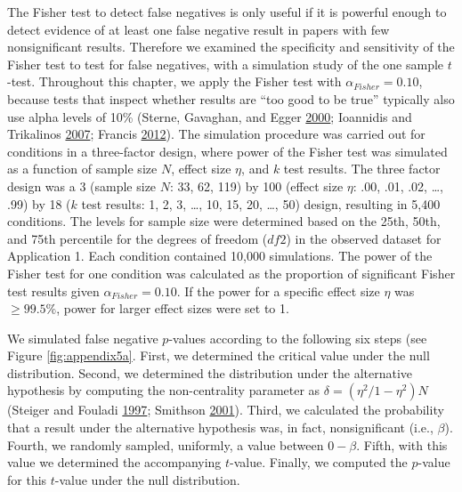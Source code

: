 \documentclass[a5paper]{book}
\begin{document}
The Fisher test to detect false negatives is only useful if it is
powerful enough to detect evidence of at least one false negative result
in papers with few nonsignificant results. Therefore we examined the
specificity and sensitivity of the Fisher test to test for false
negatives, with a simulation study of the one sample \(t\)-test.
Throughout this chapter, we apply the Fisher test with
\(\alpha_{Fisher}=0.10\), because tests that inspect whether results are
\enquote{too good to be true} typically also use alpha levels of 10\%
(Sterne, Gavaghan, and Egger
\protect\hyperlink{ref-doi:10.1016ux2fs0895-43560000242-0}{2000};
Ioannidis and Trikalinos
\protect\hyperlink{ref-doi:10.1177ux2f1740774507079441}{2007}; Francis
\protect\hyperlink{ref-doi:10.3758ux2fs13423-012-0227-9}{2012}). The
simulation procedure was carried out for conditions in a three-factor
design, where power of the Fisher test was simulated as a function of
sample size \(N\), effect size \(\eta\), and \(k\) test results. The
three factor design was a 3 (sample size \(N\): 33, 62, 119) by 100
(effect size \(\eta\): .00, .01, .02, \ldots{}, .99) by 18 (\(k\) test
results: 1, 2, 3, \ldots{}, 10, 15, 20, \ldots{}, 50) design, resulting
in 5,400 conditions. The levels for sample size were determined based on
the 25th, 50th, and 75th percentile for the degrees of freedom (\(df2\))
in the observed dataset for Application 1. Each condition contained
10,000 simulations. The power of the Fisher test for one condition was
calculated as the proportion of significant Fisher test results given
\(\alpha_{Fisher}=0.10\). If the power for a specific effect size
\(\eta\) was \(\geq99.5\%\), power for larger effect sizes were set to
1.

We simulated false negative \(p\)-values according to the following six
steps (see Figure \ref{fig:appendix5a}. First, we determined the
critical value under the null distribution. Second, we determined the
distribution under the alternative hypothesis by computing the
non-centrality parameter as \(\delta=(\eta^2/1-\eta^2)N\) (Steiger and
Fouladi \protect\hyperlink{ref-Steiger1997-qq}{1997}; Smithson
\protect\hyperlink{ref-doi:10.1177ux2f00131640121971392}{2001}). Third,
we calculated the probability that a result under the alternative
hypothesis was, in fact, nonsignificant (i.e., \(\beta\)). Fourth, we
randomly sampled, uniformly, a value between \(0-\beta\). Fifth, with
this value we determined the accompanying \(t\)-value. Finally, we
computed the \(p\)-value for this \(t\)-value under the null
distribution.
\end{document}
